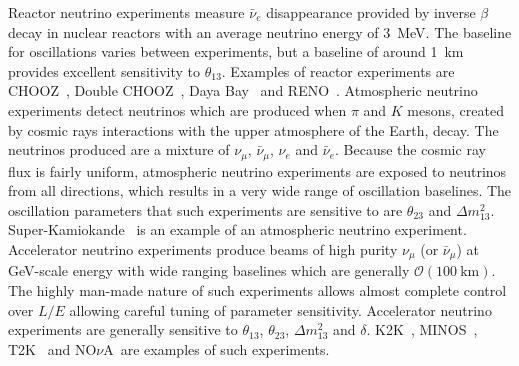 \newline
\newline
Reactor neutrino experiments measure $\bar{\nu}_e$ disappearance provided by inverse $\beta$ decay in nuclear reactors with an average neutrino energy of 3~MeV.  The baseline for oscillations varies between experiments, but a baseline of around 1~km provides excellent sensitivity to $\theta_{13}$. Examples of reactor experiments are CHOOZ~\cite{CHOOZ}, Double CHOOZ~\cite{Abe201366}, Daya Bay~\cite{PhysRevLett.108.171803} and RENO~\cite{PhysRevLett.108.191802}.
\newline
\newline
Atmospheric neutrino experiments detect neutrinos which are produced when $\pi$ and $K$ mesons, created by cosmic rays interactions with the upper atmosphere of the Earth, decay.  The neutrinos produced are a mixture of $\nu_\mu$, $\bar{\nu}_\mu$, $\nu_e$ and $\bar{\nu}_e$.  Because the cosmic ray flux is fairly uniform, atmospheric neutrino experiments are exposed to neutrinos from all directions, which results in a very wide range of oscillation baselines.  The oscillation parameters that such experiments are sensitive to are $\theta_{23}$ and $\Delta m^2_{13}$. Super-Kamiokande~\cite{PhysRevLett.81.1562} is an example of an atmospheric neutrino experiment. 
\newline
\newline
Accelerator neutrino experiments produce beams of high purity $\nu_\mu$ (or $\bar{\nu}_\mu$) at GeV-scale energy with wide ranging baselines which are generally $\mathcal{O}\left(100~\textrm{km}\right)$.  The highly man-made nature of such experiments allows almost complete control over $L/E$ allowing careful tuning of parameter sensitivity.  Accelerator neutrino experiments are generally sensitive to $\theta_{13}$, $\theta_{23}$, $\Delta m^{2}_{13}$ and $\delta$. K2K~\cite{PhysRevD.74.072003}, MINOS~\cite{PhysRevLett.97.191801}, T2K~\cite{PhysRevLett.112.061802} and NO$\nu$A~\cite{Ayres:2004js}are examples of such experiments.

